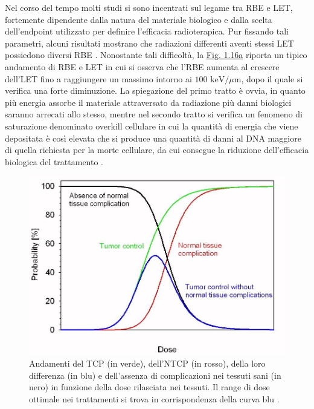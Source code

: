 \documentclass[12pt,a4paper,twoside]{report}
\begin{document}
	Nel corso del tempo molti studi si sono incentrati sul legame tra RBE e LET, fortemente dipendente dalla natura del materiale biologico e dalla scelta dell'endpoint utilizzato per definire l'efficacia radioterapica. Pur fissando tali parametri, alcuni risultati mostrano che radiazioni differenti aventi stessi LET possiedono diversi RBE \cite{jicru}. Nonostante tali difficoltà, la \hyperref[fig:let_rbe]{Fig. 1.16a} riporta un tipico andamento di RBE e LET in cui si osserva che l'RBE aumenta al crescere dell'LET fino a raggiungere un massimo intorno ai $100\mbox{ keV}/\mu\mbox{m}$, dopo il quale si verifica una forte diminuzione. La spiegazione del primo tratto è ovvia, in quanto più energia assorbe il materiale attraversato da radiazione più danni biologici saranno arrecati allo stesso, mentre nel secondo tratto si verifica un fenomeno di saturazione denominato overkill cellulare in cui la quantità di energia che viene depositata è così elevata che si produce una quantità di danni al DNA maggiore di quella richiesta per la morte cellulare, da cui consegue la riduzione dell'efficacia biologica del trattamento \cite{linz2011ion}.
	\begin{figure}[H]
		\centering
		\includegraphics[width=0.9\linewidth]{tcp.jpg}
		\caption{Andamenti del TCP (in verde), dell'NTCP (in rosso), della loro differenza (in blu) e dell'assenza di complicazioni nei tessuti sani (in nero) in funzione della dose rilasciata nei tessuti. Il range di dose ottimale nei trattamenti si trova in corrispondenza della curva blu \cite{Jensen2019}.}
		\label{fig:tcp}
	\end{figure}
\end{document}
